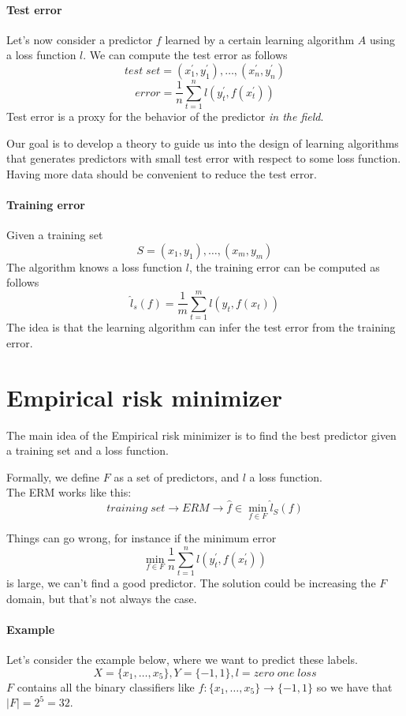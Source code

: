 \paragraph{Test error}
Let's now consider a predictor $f$ learned by a certain learning algorithm $A$ 
using a loss function $l$.
We can compute the test error as follows
$$\mathit{test\;set} = (x^\prime_1, y^\prime_1), \dots,(x^\prime_n, y^\prime_n)$$
$$\mathit{error} = \frac{1}{n}\sum_{t=1}^n l(y^\prime_t, f(x^\prime_t))$$
Test error is a proxy for the behavior of the predictor \emph{in the field}.

\begin{remark}
    Our goal is to develop a theory to guide us into the design of learning algorithms 
    that generates predictors with small test error with respect to some loss function.\\
    Having more data should be convenient to reduce the test error.
\end{remark}

\paragraph{Training error}
Given a training set
$$S = (x_1, y_1), \dots,(x_m, y_m)$$
The algorithm knows a loss function $l$, the training error can be computed as follows
$$\hat{l}_s(f) = \frac{1}{m}\sum_{t=1}^m l(y_t, f(x_t))$$
The idea is that the learning algorithm can infer the test error from the training error.

\section{Empirical risk minimizer}
The main idea of the Empirical risk minimizer is to find the best predictor given 
a training set and a loss function.

Formally, we define $F$ as a set of predictors, and $l$ a loss function.\\
The ERM works like this:
$$\mathit{training\;set} \longrightarrow \mathit{ERM} \longrightarrow 
\hat{f} \in \min_{f \in F} \hat{l}_S(f)$$

Things can go wrong, for instance if the minimum error
$$\min_{f \in F} \frac{1}{n}\sum_{t = 1}^n l(y_t^\prime, f(x_t^\prime))$$
is large, we can't find a good predictor. The solution could be increasing the $F$ domain, 
but that's not always the case.

\paragraph{Example}
Let's consider the example below, where we want to predict these labels.
$$X = \{x_1, \dots, x_5\}, Y = \{-1,1\}, l = \mathit{zero\;one\;loss}$$
$F$ contains all the binary classifiers like
$f : \{x_1, \dots, x_5\} \longrightarrow \{-1,1\}$
so we have that $|F| = 2^5 = 32$. 

